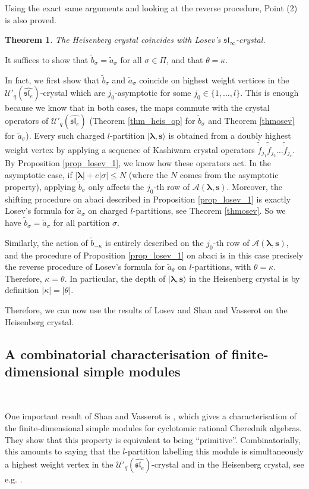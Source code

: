 \documentclass[twoside,12pt]{amsart}
\theoremstyle{plain}
\newcommand{\fl}{\mathfrak{l}}
\newcommand{\fs}{\mathfrak{s}}
\newcommand{\cA}{\mathcal{A}}
\newcommand{\bs}{\mathbf{s}}
\newcommand{\si}{\sigma}
\newcommand{\la}{\lambda}
\newcommand{\ka}{\kappa}
\newcommand{\bla}{\boldsymbol{\la}}
\newcommand{\ta}{\tilde{a}}
\newcommand{\tb}{\tilde{b}}
\newcommand{\tdf}{\tilde{\dot{f}}}
\newcommand{\Ue}{\mathcal{U}'_q (\widehat{\mathfrak{sl}_e})}
\newtheorem{thm}[num]{Theorem}
\theoremstyle{remark}
\begin{document}
Using the exact same arguments and looking at the reverse procedure,
Point (2) is also proved.
\endproof


\begin{thm}\label{thmosev2}
The Heisenberg crystal coincides with Losev's $\fs\fl_\infty$-crystal.
\end{thm}

\proof
It suffices to show that $\tb_\si = \ta_\si$ for all $\si\in\Pi$, 
and that $\theta=\ka$.

In fact, we first show that $\tb_\si$
and $\ta_\si$ coincide on highest weight vertices in the $\Ue$-crystal
which are $j_0$-asymptotic for some $j_0\in\{1,\dots,l\}$.
This is enough because we know that in both cases, the maps commute
with the crystal operators of $\Ue$ 
(Theorem \ref{thm_heis_op} for $\tb_\si$ and Theorem \ref{thmosev} for $\ta_\si$).
Every such charged $l$-partition $|\bla,\bs\rangle$ 
is obtained from a doubly highest weight vertex
by applying a sequence of Kashiwara crystal operators $\tdf_{j_1}\tdf_{j_2}\dots\tdf_{j_r}$.
By Proposition \ref{prop_losev_1}, we know how these operators act.
In the asymptotic case, if $|\bla|+e|\si|\leq N$ 
(where the $N$ comes from the asymptotic property),
applying $\tb_{\si}$ only affects the $j_0$-th row of $\cA(\bla,\bs)$.
Moreover, the shifting procedure on abaci described in Proposition \ref{prop_losev_1}
is exactly Losev's formula for $\ta_{\si}$ on charged $l$-partitions, see Theorem \ref{thmosev}.
So we have $\tb_\si = \ta_\si$ for all partition $\si$.

Similarly, the action of $\tb_{-\ka}$ is entirely described on the
$j_0$-th row of $\cA(\bla,\bs)$,
and the procedure of Proposition \ref{prop_losev_1} on abaci
is in this case precisely the reverse procedure 
of Losev's formula for $\ta_{\theta}$ on $l$-partitions, with $\theta=\ka$.
Therefore, $\ka=\theta$.
In particular, the depth of $|\bla,\bs\rangle$ in the Heisenberg crystal is by definition 
$|\ka|=|\theta|$.
\endproof


Therefore, we can now use the results of Losev \cite{Losev2015} and Shan and Vasserot \cite{ShanVasserot2012}
on the Heisenberg crystal.



\subsection{A combinatorial characterisation of finite-dimensional simple modules}\label{prim}\

One important result of Shan and Vasserot is \cite[Proposition 5.18]{ShanVasserot2012},
which gives a characterisation of the finite-dimensional simple modules for cyclotomic rational Cherednik algebras.
They show that this property is equivalent to being ``primitive''.
Combinatorially, this amounts to saying that the $l$-partition 
labelling this module is simultaneously a highest weight vertex in the $\Ue$-crystal and
in the Heisenberg crystal, see e.g. \cite[Section 5.1.1]{Losev2015}.
\end{document}
